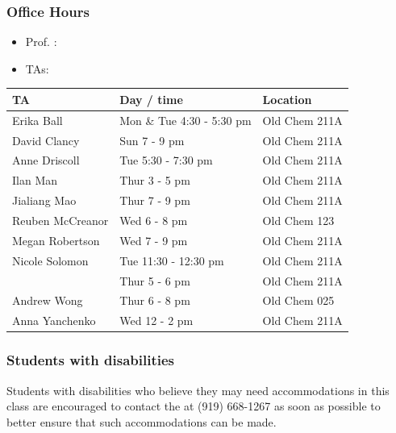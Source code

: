 \documentclass[slidestop,compress,mathserif,12pt,t,professionalfonts,xcolor=table]{beamer}
\begin{document}
\begin{frame}
\frametitle{Office Hours}

\begin{itemize}
\item Prof. \LastName{}: \OfficeHours{}
\item TAs: 
\end{itemize}
{\small
{}
\begin{tabular}{l | l | l}
TA				& Day / time						& Location \\
\hline
Erika Ball			& Mon \& Tue 4:30 - 5:30 pm			& Old Chem 211A \\
David Clancy		& Sun 7 - 9 pm						& Old Chem 211A \\
Anne Driscoll		& Tue 5:30 - 7:30 pm					& Old Chem 211A \\
Ilan Man			& Thur 3 - 5 pm						& Old Chem 211A \\
Jialiang Mao		& Thur 7 - 9 pm						& Old Chem 211A \\
Reuben McCreanor	& Wed 6 - 8 pm						& Old Chem 123 \\
Megan Robertson	& Wed 7 - 9 pm						& Old Chem 211A \\
Nicole Solomon		& Tue 11:30 - 12:30 pm 				& Old Chem 211A \\
				& Thur 5 - 6 pm						& Old Chem 211A \\
Andrew Wong		& Thur 6 - 8 pm						& Old Chem 025 \\
Anna Yanchenko	& Wed 12 - 2 pm					& Old Chem 211A \\
\end{tabular}
}

\end{frame}


\begin{frame}
\frametitle{Students with disabilities}

Students with disabilities who believe they may need accommodations in this class are 
encouraged to contact the 
 at (919) 668-1267 as soon as possible to better ensure that such 
accommodations can be made.

\vfill



\end{frame}
\end{document}
